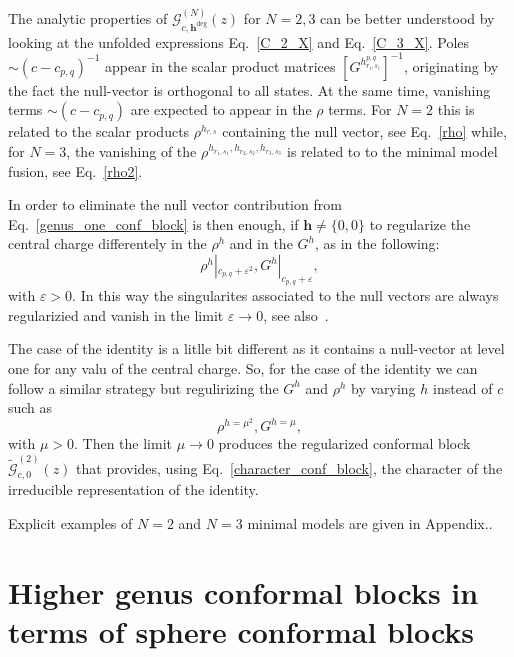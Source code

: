 \documentclass[a4paper,11pt]{article}
\begin{document}
\noindent The analytic properties of $\mathcal{G}_{c, \boldsymbol{h}^{\text{deg}}}^{(N)}(z)$ for $N=2,3$  can be better understood by looking at the unfolded expressions Eq.~\eqref{C_2_X} and Eq.~\eqref{C_3_X}. Poles $\sim (c-c_{p,q})^{-1}$ appear in the scalar product matrices  $ \left[G^{h^{p,q}_{r_i,s_i}}\right]^{-1}$, originating by the fact the null-vector is orthogonal to all states.  At the same time, vanishing terms $\sim(c-c_{p,q})$ are expected to appear in the $\rho$ terms. For $N=2$ this is related to the scalar products $\rho^{h_{r,s}}$ containing the null vector, see Eq.~\eqref{rho} while, for $N= 3$, the vanishing of the $\rho^{h_{r_1,s_1},h_{r_2,s_2},h_{r_3,s_3}}$ is related to to the minimal model fusion, see Eq.~\eqref{rho2}.  

 


\noindent  In order to eliminate the null vector contribution from Eq.~\eqref{genus_one_conf_block} is then
enough, if $\boldsymbol{h}\neq \{0,0\}$ to regularize  the central charge differentely in the  
$\rho^h$ and in the $G^h$, as in the following:  
\begin{equation}\label{regularization}
 \rho^h|_{c_{p,q}+\varepsilon^2}, G^h|_{c_{p,q}+\varepsilon},
\end{equation}
with $\varepsilon>0$. In this way the singularites associated to the null vectors are always regularizied and vanish in the limit  $\varepsilon\to 0$, see also~\cite{SV, Alkalaev}.

The case of the identity is a litlle bit different as it contains a null-vector at level one for any valu of the central charge. So, 
for the case of the identity  we can follow a similar strategy but regulirizing  the $G^h$ and 
$\rho^h$ by varying  $h$ instead of $c$ such as
\begin{equation}\label{regularization_identity}
 \rho^{h=\mu^2}, G^{h=\mu},
\end{equation}
with $\mu>0$. Then the limit $\mu\to 0$ produces the regularized 
conformal block $\tilde{\mathcal{G}}_{c, 0}^{(2)}(z)$ that
provides, using Eq.~\eqref{character_conf_block}, the  character of the irreducible representation of the identity.

\noindent Explicit examples of $N=2$ and $N=3$ minimal models are given in Appendix.. 


\section{Higher genus conformal blocks in terms of sphere conformal blocks}\label{app_sphere_conf_blocks}
\end{document}
